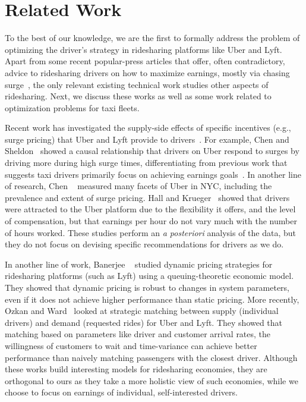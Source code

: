 
\section{Related Work}
\label{sec:related_work}

To the best of our knowledge, we are the first to formally address the problem of optimizing
the driver's strategy in ridesharing platforms like Uber and Lyft. 
Apart from 
some recent popular-press articles that 
offer, often contradictory, advice to ridesharing drivers on how to maximize earnings, mostly via chasing surge~\cite{dont,tips}, 
the only relevant existing technical work 
studies other aspects of ridesharing. 
Next, we discuss these works as well as some work related to optimization problems
for taxi fleets.


Recent work has investigated the supply-side effects of specific incentives (e.g., surge pricing) that Uber and Lyft provide to drivers~\cite{slaves}.  For example, Chen and Sheldon~\cite{chen2016dynamic} showed a causal relationship that drivers on Uber respond to surges by driving more during high surge times,  differentiating from previous work that suggests taxi drivers primarily focus on achieving earnings goals~\cite{camerer1997labor}. 
In another line of research,
Chen {\etal}~\cite{chen2015peeking} measured many facets of Uber in NYC, including the prevalence and extent 
  of surge pricing.
Hall and Krueger~\cite{hall2016analysis} showed that drivers were attracted to the Uber platform due to the flexibility it offers, 
and the level of compensation, but that earnings per hour do not vary much with the number of hours worked. 
These studies perform an {\em a posteriori} analysis of the data,
but they do not focus on devising specific recommendations for drivers as we do.


 In another line of work, Banerjee {\etal}~\cite{banerjee2015pricing} studied  
 dynamic
pricing strategies for ridesharing platforms (such as Lyft) using a 
queuing-theoretic economic model. 
They showed that dynamic pricing is robust to changes in system parameters, even if it does not 
  achieve higher performance than static pricing.  
More recently, Ozkan and Ward~\cite{ozkan2016dynamic} looked at strategic matching between supply (individual drivers) 
  and demand (requested rides) for Uber and Lyft.
They showed that matching based on parameters like driver and customer arrival rates,  the willingness of customers to wait and time-variance can achieve better performance than naively matching 
passengers with the closest driver. 
Although these works build interesting models for ridesharing economies, they are
orthogonal to ours as they take a more holistic view of such economies, while we choose to focus 
 on earnings of individual, self-interested drivers.




